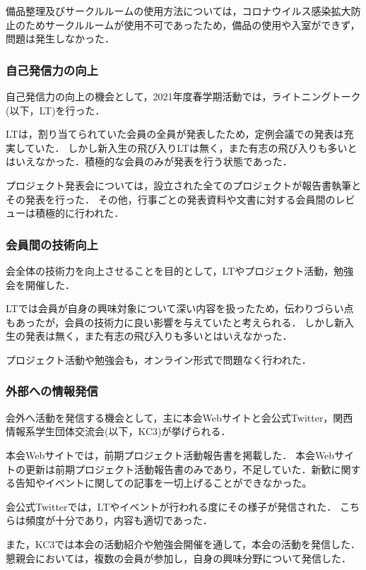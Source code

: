     備品整理及びサークルルームの使用方法については，コロナウイルス感染拡大防止のためサークルルームが使用不可であったため，備品の使用や入室ができず，問題は発生しなかった．

\subsubsection*{自己発信力の向上}
    自己発信力の向上の機会として，2021年度春学期活動では，ライトニングトーク(以下，LT)を行った．

    LTは，割り当てられていた会員の全員が発表したため，定例会議での発表は充実していた．
    しかし新入生の飛び入りLTは無く，また有志の飛び入りも多いとはいえなかった．積極的な会員のみが発表を行う状態であった．

    プロジェクト発表会については，設立された全てのプロジェクトが報告書執筆とその発表を行った．
    その他，行事ごとの発表資料や文書に対する会員間のレビューは積極的に行われた．

\subsubsection*{会員間の技術向上}
    会全体の技術力を向上させることを目的として，LTやプロジェクト活動，勉強会を開催した．

    LTでは会員が自身の興味対象について深い内容を扱ったため，伝わりづらい点もあったが，会員の技術力に良い影響を与えていたと考えられる．
    しかし新入生の発表は無く，また有志の飛び入りも多いとはいえなかった．

    プロジェクト活動や勉強会も，オンライン形式で問題なく行われた．

\subsubsection*{外部への情報発信}
    会外へ活動を発信する機会として，主に本会Webサイトと会公式Twitter，関西情報系学生団体交流会(以下，KC3)が挙げられる．

    本会Webサイトでは，前期プロジェクト活動報告書を掲載した．
    本会Webサイトの更新は前期プロジェクト活動報告書のみであり，不足していた．新歓に関する告知やイベントに関しての記事を一切上げることができなかった。
    
    会公式Twitterでは，LTやイベントが行われる度にその様子が発信された．
    こちらは頻度が十分であり，内容も適切であった．
    
    また，KC3では本会の活動紹介や勉強会開催を通して，本会の活動を発信した．
    懇親会においては，複数の会員が参加し，自身の興味分野について発信した．
    

